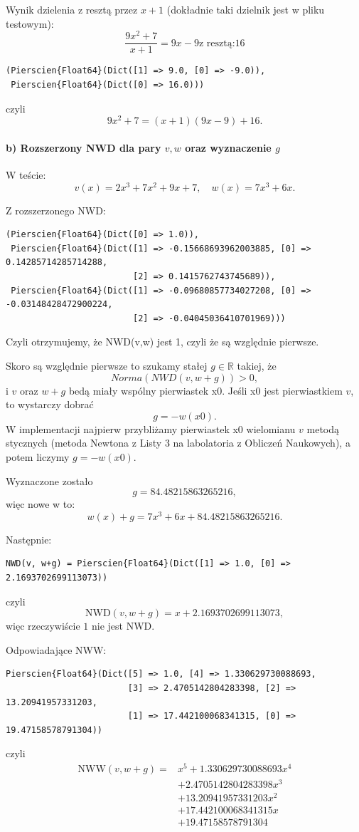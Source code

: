\documentclass[12pt,a4paper]{article}
\begin{document}
Wynik dzielenia z resztą przez $x+1$ (dokładnie taki dzielnik jest w pliku testowym):
\[
\frac{9x^2+7}{x + 1}=9x-9 \text{z resztą:} 16
\]
\begin{verbatim}
(Pierscien{Float64}(Dict([1] => 9.0, [0] => -9.0)),
 Pierscien{Float64}(Dict([0] => 16.0)))
\end{verbatim}
czyli
\[
9x^2+7 = (x+1)(9x-9) + 16.
\]

\paragraph{b) Rozszerzony NWD dla pary $v,w$ oraz wyznaczenie $g$}
W teście:
\[
v(x)=2x^3+7x^2+9x+7,
\quad
w(x)=7x^3+6x.
\]

Z rozszerzonego NWD:
\begin{verbatim}
(Pierscien{Float64}(Dict([0] => 1.0)),
 Pierscien{Float64}(Dict([1] => -0.15668693962003885, [0] => 0.14285714285714288,
						 [2] => 0.1415762743745689)),
 Pierscien{Float64}(Dict([1] => -0.09680857734027208, [0] => -0.03148428472900224,
						 [2] => -0.04045036410701969)))
\end{verbatim}
Czyli otrzymujemy, że NWD(v,w) jest 1, czyli że są względnie pierwsze.

Skoro są względnie pierwsze to szukamy stałej $g \in \mathbb{R}$ takiej, że
\[
Norma(NWD(v, w+g)) > 0,
\]
i $v$ oraz $w+g$ bedą miały wspólny pierwiastek x0. Jeśli x0 jest pierwiastkiem $v$, to wystarczy dobrać
\[
g = -w(x0).
\]
W implementacji najpierw przybliżamy pierwiastek x0 wielomianu $v$ metodą stycznych (metoda Newtona z Listy 3 na labolatoria z Obliczeń Naukowych), a potem liczymy $g=-w(x0)$.

Wyznaczone zostało
\[
g = 84.48215863265216,
\]
więc nowe w to:
\[
w(x)+g = 7x^3 + 6x + 84.48215863265216.
\]

Następnie:
\begin{verbatim}
NWD(v, w+g) = Pierscien{Float64}(Dict([1] => 1.0, [0] => 2.1693702699113073))
\end{verbatim}
czyli
\[
\mathrm{NWD}(v,w+g)=x+2.1693702699113073,
\]
więc rzeczywiście $1$ nie jest NWD.

Odpowiadające NWW:
\begin{verbatim}
Pierscien{Float64}(Dict([5] => 1.0, [4] => 1.330629730088693,
						[3] => 2.4705142804283398, [2] => 13.20941957331203,
						[1] => 17.442100068341315, [0] => 19.47158578791304))
\end{verbatim}
czyli
\begin{align*}
\mathrm{NWW}(v,w+g) = {} & x^5 + 1.330629730088693x^4 \\
& + 2.4705142804283398x^3 \\
& + 13.20941957331203x^2 \\
& + 17.442100068341315x \\
& + 19.47158578791304
\end{align*}
\end{document}
